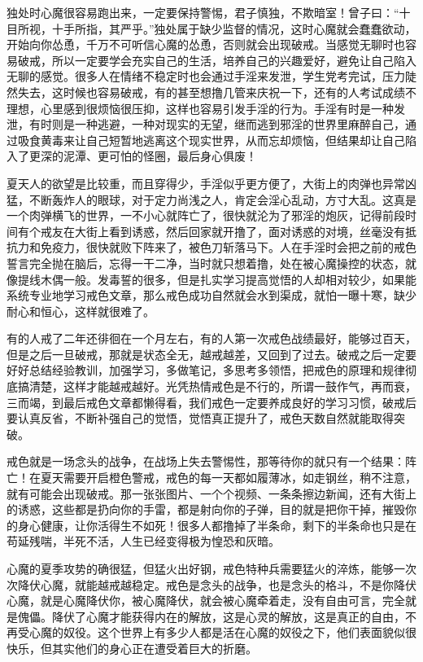 独处时心魔很容易跑出来，一定要保持警惕，君子慎独，不欺暗室！曾子曰：“十目所视，十手所指，其严乎。”独处属于缺少监督的情况，这时心魔就会蠢蠢欲动，开始向你怂恿，千万不可听信心魔的怂恿，否则就会出现破戒。当感觉无聊时也容易破戒，所以一定要学会充实自己的生活，培养自己的兴趣爱好，避免让自己陷入无聊的感觉。很多人在情绪不稳定时也会通过手淫来发泄，学生党考完试，压力陡然失去，这时候也容易破戒，有的甚至想撸几管来庆祝一下，还有的人考试成绩不理想，心里感到很烦恼很压抑，这样也容易引发手淫的行为。手淫有时是一种发泄，有时则是一种逃避，一种对现实的无望，继而逃到邪淫的世界里麻醉自己，通过吸食黄毒来让自己短暂地逃离这个现实世界，从而忘却烦恼，但结果却让自己陷入了更深的泥潭、更可怕的怪圈，最后身心俱废！

夏天人的欲望是比较重，而且穿得少，手淫似乎更方便了，大街上的肉弹也异常凶猛，不断轰炸人的眼球，对于定力尚浅之人，肯定会淫心乱动，方寸大乱。这真是一个肉弹横飞的世界，一不小心就阵亡了，很快就沦为了邪淫的炮灰，记得前段时间有个戒友在大街上看到诱惑，然后回家就开撸了，面对诱惑的对境，丝毫没有抵抗力和免疫力，很快就败下阵来了，被色刀斩落马下。人在手淫时会把之前的戒色誓言完全抛在脑后，忘得一干二净，当时就只想着撸，处在被心魔操控的状态，就像提线木偶一般。发毒誓的很多，但是扎实学习提高觉悟的人却相对较少，如果能系统专业地学习戒色文章，那么戒色成功自然就会水到渠成，就怕一曝十寒，缺少耐心和恒心，这样就很难了。

有的人戒了二年还徘徊在一个月左右，有的人第一次戒色战绩最好，能够过百天，但是之后一旦破戒，那就是状态全无，越戒越差，又回到了过去。破戒之后一定要好好总结经验教训，加强学习，多做笔记，多思考多领悟，把戒色的原理和规律彻底搞清楚，这样才能越戒越好。光凭热情戒色是不行的，所谓一鼓作气，再而衰，三而竭，到最后戒色文章都懒得看，我们戒色一定要养成良好的学习习惯，破戒后要认真反省，不断补强自己的觉悟，觉悟真正提升了，戒色天数自然就能取得突破。

戒色就是一场念头的战争，在战场上失去警惕性，那等待你的就只有一个结果：阵亡！在夏天需要开启橙色警戒，戒色的每一天都如履薄冰，如走钢丝，稍不注意，就有可能会出现破戒。那一张张图片、一个个视频、一条条擦边新闻，还有大街上的诱惑，这些都是扔向你的手雷，都是射向你的子弹，目的就是把你干掉，摧毁你的身心健康，让你活得生不如死！很多人都撸掉了半条命，剩下的半条命也只是在苟延残喘，半死不活，人生已经变得极为惶恐和灰暗。

心魔的夏季攻势的确很猛，但猛火出好钢，戒色特种兵需要猛火的淬炼，能够一次次降伏心魔，就能越戒越稳定。戒色是念头的战争，也是念头的格斗，不是你降伏心魔，就是心魔降伏你，被心魔降伏，就会被心魔牵着走，没有自由可言，完全就是傀儡。降伏了心魔才能获得内在的解放，这是心灵的解放，这是真正的自由，不再受心魔的奴役。这个世界上有多少人都是活在心魔的奴役之下，他们表面貌似很快乐，但其实他们的身心正在遭受着巨大的折磨。

